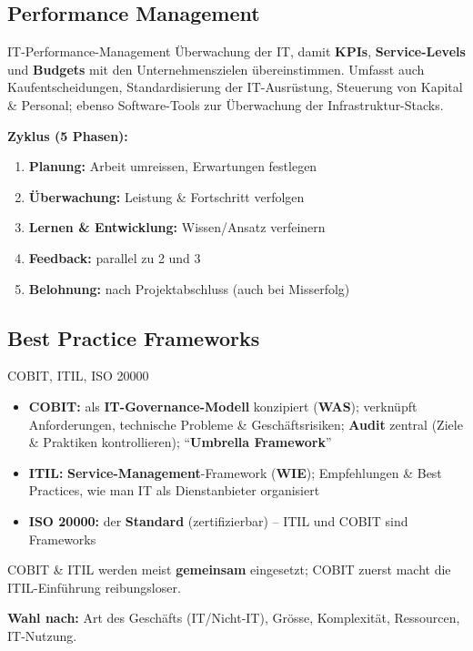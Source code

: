 \documentclass[a4paper, fontsize=7pt]{scrartcl}
\begin{document}
\subsection{Performance Management}

\begin{mainbox}{IT-Performance-Management}
Überwachung der IT, damit \textbf{KPIs}, \textbf{Service-Levels} und
\textbf{Budgets} mit den Unternehmenszielen übereinstimmen. Umfasst auch
Kaufentscheidungen, Standardisierung der IT-Ausrüstung, Steuerung von Kapital
\& Personal; ebenso Software-Tools zur Überwachung der Infrastruktur-Stacks.

\textbf{Zyklus (5 Phasen):}
\begin{enumerate}
    \item \textbf{Planung:} Arbeit umreissen, Erwartungen festlegen
    \item \textbf{Überwachung:} Leistung \& Fortschritt verfolgen
    \item \textbf{Lernen \& Entwicklung:} Wissen/Ansatz verfeinern
    \item \textbf{Feedback:} parallel zu 2 und 3
    \item \textbf{Belohnung:} nach Projektabschluss (auch bei Misserfolg)
\end{enumerate}
\end{mainbox}

\subsection{Best Practice Frameworks}

\begin{mainbox}{COBIT, ITIL, ISO 20000}
\begin{itemize}
    \item \textbf{COBIT:} als \textbf{IT-Governance-Modell} konzipiert
          (\textbf{WAS}); verknüpft Anforderungen, technische Probleme \&
          Geschäftsrisiken; \textbf{Audit} zentral (Ziele \& Praktiken
          kontrollieren); ``\textbf{Umbrella Framework}''
    \item \textbf{ITIL:} \textbf{Service-Management}-Framework (\textbf{WIE});
          Empfehlungen \& Best Practices, wie man IT als Dienstanbieter
          organisiert
    \item \textbf{ISO 20000:} der \textbf{Standard} (zertifizierbar) --
          ITIL und COBIT sind Frameworks
\end{itemize}
COBIT \& ITIL werden meist \textbf{gemeinsam} eingesetzt; COBIT zuerst macht
die ITIL-Einführung reibungsloser.

\textbf{Wahl nach:} Art des Geschäfts (IT/Nicht-IT), Grösse, Komplexität,
Ressourcen, IT-Nutzung.
\end{mainbox}
\end{document}
